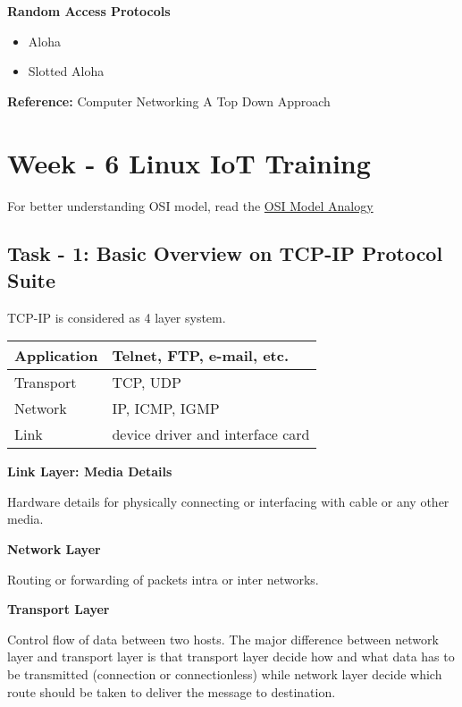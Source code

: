 \documentclass[letterpaper,10pt,english]{sphinxmanual}
\begin{document}
\textbf{Random Access Protocols}
\begin{itemize}
\item {} 
Aloha

\item {} 
Slotted Aloha

\end{itemize}

\textbf{Reference:} Computer Networking A Top Down Approach


\chapter{Week - 6 Linux IoT Training}
\label{week-06:week-06}\label{week-06:week-6-linux-iot-training}\label{week-06::doc}
For better understanding OSI model, read the \href{http://www.tcpipguide.com/free/t\_UnderstandingTheOSIReferenceModelAnAnalogy.htm}{OSI Model Analogy}


\section{Task - 1: Basic Overview on TCP-IP Protocol Suite}
\label{week-06:task-1-basic-overview-on-tcp-ip-protocol-suite}
TCP-IP is considered as 4 layer system.

\begin{tabulary}{\linewidth}{|L|L|}
\hline

Application
 & 
Telnet, FTP, e-mail, etc.
\\
\hline
Transport
 & 
TCP, UDP
\\
\hline
Network
 & 
IP, ICMP, IGMP
\\
\hline
Link
 & 
device driver and interface card
\\
\hline\end{tabulary}


\textbf{Link Layer: Media Details}

Hardware details for physically connecting or interfacing with cable or any other media.

\textbf{Network Layer}

Routing or forwarding of packets intra or inter networks.

\textbf{Transport Layer}

Control flow of data between two hosts.
The major difference between network layer and transport layer is that transport layer decide how and what data has to be transmitted (connection or connectionless) while network layer decide which route  should be taken to deliver the message to destination.
\end{document}
